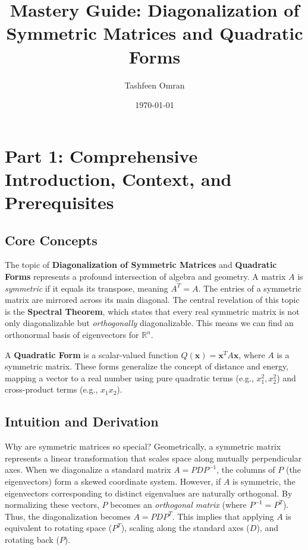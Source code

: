 \documentclass[11pt, letterpaper]{article}
\title{\textbf{Mastery Guide: Diagonalization of Symmetric Matrices and Quadratic Forms}}
\author{Tashfeen Omran}
\date{\today}
\theoremstyle{definition}
\theoremstyle{remark}
\newcommand{\R}{\mathbb{R}}
\begin{document}
\maketitle
\tableofcontents
\newpage

\section{Part 1: Comprehensive Introduction, Context, and Prerequisites}

\subsection{Core Concepts}
The topic of \textbf{Diagonalization of Symmetric Matrices} and \textbf{Quadratic Forms} represents a profound intersection of algebra and geometry. 
A matrix $A$ is \textit{symmetric} if it equals its transpose, meaning $A^T = A$. The entries of a symmetric matrix are mirrored across its main diagonal. 
The central revelation of this topic is the \textbf{Spectral Theorem}, which states that every real symmetric matrix is not only diagonalizable but \textit{orthogonally} diagonalizable. This means we can find an orthonormal basis of eigenvectors for $\R^n$. 

A \textbf{Quadratic Form} is a scalar-valued function $Q(\mathbf{x}) = \mathbf{x}^T A \mathbf{x}$, where $A$ is a symmetric matrix. These forms generalize the concept of distance and energy, mapping a vector to a real number using pure quadratic terms (e.g., $x_1^2, x_2^2$) and cross-product terms (e.g., $x_1 x_2$).

\subsection{Intuition and Derivation}
Why are symmetric matrices so special? Geometrically, a symmetric matrix represents a linear transformation that scales space along mutually perpendicular axes. 
When we diagonalize a standard matrix $A = PDP^{-1}$, the columns of $P$ (the eigenvectors) form a skewed coordinate system. However, if $A$ is symmetric, the eigenvectors corresponding to distinct eigenvalues are naturally orthogonal. By normalizing these vectors, $P$ becomes an \textit{orthogonal matrix} (where $P^{-1} = P^T$). Thus, the diagonalization becomes $A = PDP^T$. This implies that applying $A$ is equivalent to rotating space ($P^T$), scaling along the standard axes ($D$), and rotating back ($P$).
\end{document}
